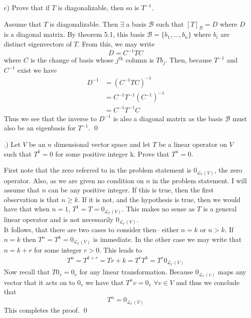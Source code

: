 \documentclass[a4paper, 11pt]{article}
\newcommand{\F}{\mathbb{F}}
\newenvironment{solution}{%
	\begin{list}{}{%
			\setlength{\topsep}{0pt}%
			\setlength{\leftmargin}{1.5cm}%
			\setlength{\rightmargin}{1.5cm}%
			\setlength{\listparindent}{\parindent}%
			\setlength{\itemindent}{\parindent}%
			\setlength{\parsep}{\parskip}%
		}%
		\item[]}{\end{list}}
\begin{document}
\noindent c) Prove that if $T$ is diagonalizable, then so is $T^{-1}$. \\
\begin{solution}
  \noindent Assume that $T$ is diagonalizable. Then $\exists$ a basis $\mathcal{B}$ such that $[T]_\mathcal{B} = D$ where $D$ is a diagonal matrix. By theorem 5.1, this basis $\mathcal{B} = \{b_1, \dots , b_n\}$ where $b_i$ are distinct eigenvectors of $T$. From this, we may write
  \begin{equation*}
    D = C^{-1}TC
  \end{equation*}
  where $C$ is the change of basis whose $j^\text{th}$ column is $Tb_j$. Then, because $T^{-1}$ and $C^{-1}$ exist we have
  \begin{align*}
    D^{-1} &= \left(C^{-1}TC\right)^{-1} \\
    &= C^{-1}T^{-1}\left(C^{-1}\right)^{-1}\\
    &= C^{-1}T^{-1}C 
  \end{align*}
Thus we see that the inverse to $D^{-1}$ is also a diagonal matrix as the basis $\mathcal{B}$ must also be an eigenbasis for $T^{-1}$. \qed\\
\end{solution}

.) Let $V$ be an $n$ dimensional vector space and let $T$ be a linear operator on $V$ such that $T^k=0$ for some positive integer k. Prove that $T^n = 0$. \\
\begin{solution}
  \noindent First note that the zero referred to in the problem statement is $0_{\mathcal{L}_\F(V)}$, the zero operator. Also, as we are given no condition on $n$ in the problem statement. I will assume that $n$ can be any positive integer. If this is true, then the first observation is that $n\geq k$. If it is not, and the hypothesis is true, then we would have that when $n=1$, $T^1= T = 0_{\mathcal{L}_\F(V)}$. This makes no sense as $T$ is a general linear operator and is not necessarily $0_{\mathcal{L}_\F(V)}$. \\

  \noindent It follows, that there are two cases to consider then-- either $n=k$ or $n>k$. If $n=k$ then $T^n = T^k = 0_{\mathcal{L}_\F(V)}$ is immediate. In the other case we may write that $n = k + r$ for some integer $r>0$. This leads to
  \begin{align*}
    T^n = T^{k+r} = T{r+k} = T^{r}T^{k} = T^{r}0_{\mathcal{L}_\F(V)}
  \end{align*}
  Now recall that $T 0_v = 0_v$ for any linear transformation. Because $0_{\mathcal{L}_\F(v)}$ maps any vector that it acts on to $0_v$ we have that $T^n v = 0_v$ $\forall v \in V$ and thus we conclude that
  \begin{equation*}
    T^n = 0_{\mathcal{L}_\F(V)}
  \end{equation*}
  \noindent This completes the proof. \qed\\
\end{solution}
\end{document}
